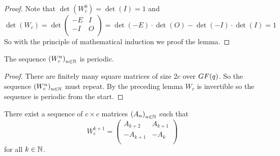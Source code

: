 \begin{proof}
  Note that $\det(W_{c}^{0}) = \det(I) = 1$ and
  \[
  \det(W_{c}) = \det
  \left(
  \begin{array}{cc}
    -E & I \\
    -I & O \\
  \end{array}
  \right)
  =
  \det(-E) \cdot \det(O) - \det(-I) \cdot \det(I)
  =
  1
  \]
  So with the principle of mathematical induction we proof the lemma.
\end{proof}

\begin{theorem}
  The sequence $\left(W_{c}^{n}\right)_{n\in\mathbb{N}}$ is periodic.
\end{theorem}

\begin{proof}
  There are finitely many square matrices of size $2c$ over
  $GF(q)$. So the sequence $\left(W_{c}^{n}\right)_{n\in\mathbb{N}}$ must
  repeat. By the preceding lemma $W_{c}$ is invertible so the
  sequence is periodic from the start.
\end{proof}

\begin{lemma}[$W$-structure]
  There exist a sequence of $c \times c$ matrices
  $\left(A_{n}\right)_{n\in\mathbb{N}}$ such that
  \[
  W_{c}^{k+1}
  =
  \left(
  \begin{array}{cc}
     A_{k+2} &  A_{k+1} \\
    -A_{k+1} & -A_{k}   \\
  \end{array}
  \right)
  \]
  for all $k\in\mathbb{N}$.
\end{lemma}

